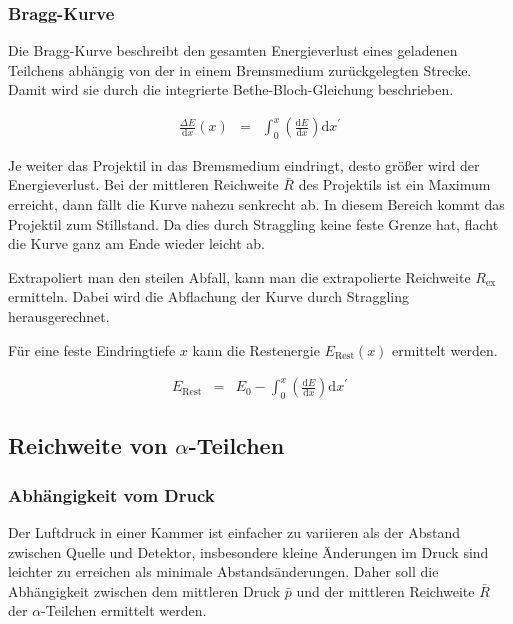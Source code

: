 \documentclass[12pt,a4paper]{scrartcl}
\numberwithin{equation}{section} %
\renewcommand{\[}{} %
\renewcommand{\]}{\noindent} %
\begin{document}
\hypertarget{bragg-kurve}{%
\subsubsection{Bragg-Kurve}\label{bragg-kurve}}

Die Bragg-Kurve beschreibt den gesamten Energieverlust eines geladenen
Teilchens abhängig von der in einem Bremsmedium zurückgelegten Strecke.
Damit wird sie durch die integrierte Bethe-Bloch-Gleichung beschrieben.

\[
\begin{eqnarray}
    \frac{\Delta E}{\mathrm dx}(x) &=&
        \int_0^x \left(\frac{\mathrm dE}{\mathrm dx}\right) \mathrm dx^\prime
\end{eqnarray}
\]

Je weiter das Projektil in das Bremsmedium eindringt, desto größer wird
der Energieverlust. Bei der mittleren Reichweite \(\bar R\) des
Projektils ist ein Maximum erreicht, dann fällt die Kurve nahezu
senkrecht ab. In diesem Bereich kommt das Projektil zum Stillstand. Da
dies durch Straggling keine feste Grenze hat, flacht die Kurve ganz am
Ende wieder leicht ab.

Extrapoliert man den steilen Abfall, kann man die extrapolierte
Reichweite \(R_\mathrm{ex}\) ermitteln. Dabei wird die Abflachung der
Kurve durch Straggling herausgerechnet.

Für eine feste Eindringtiefe \(x\) kann die Restenergie
\(E_\mathrm{Rest}(x)\) ermittelt werden.

\[
\begin{eqnarray}
    E_\mathrm{Rest}
        &=& E_0
        - \int_0^x \left(\frac{\mathrm dE}{\mathrm dx}\right) \mathrm dx^\prime
        \label{Restenergie}
\end{eqnarray}
\]

\hypertarget{reichweite-von-alpha-teilchen}{%
\subsection{\texorpdfstring{Reichweite von
\(\alpha\)-Teilchen}{Reichweite von \textbackslash alpha-Teilchen}}\label{reichweite-von-alpha-teilchen}}

\hypertarget{abhuxe4ngigkeit-vom-druck}{%
\subsubsection{Abhängigkeit vom Druck}\label{abhuxe4ngigkeit-vom-druck}}

Der Luftdruck in einer Kammer ist einfacher zu variieren als der Abstand
zwischen Quelle und Detektor, insbesondere kleine Änderungen im Druck
sind leichter zu erreichen als minimale Abstandsänderungen. Daher soll
die Abhängigkeit zwischen dem mittleren Druck \(\bar p\) und der
mittleren Reichweite \(\bar R\) der \(\alpha\)-Teilchen ermittelt
werden.
\end{document}

